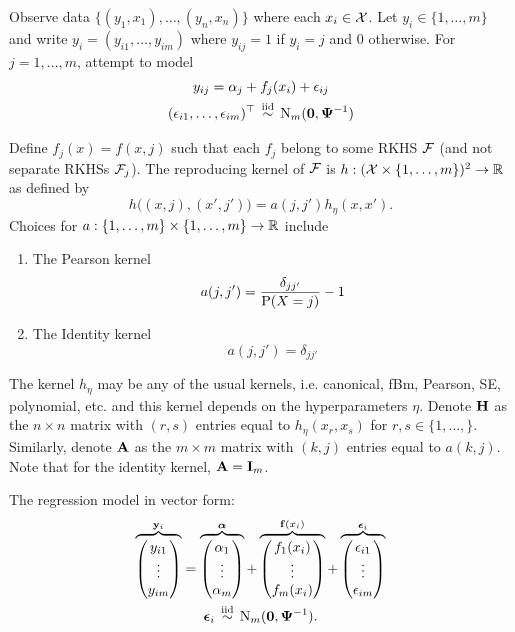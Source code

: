 Observe data $\{(y_1,x_1),\dots,(y_n,x_n) \}$ where each $x_i \in {\mathcal X}$.
Let $y_i \in \{ 1,\dots,m \}$ and write $y_i = (y_{i1},\dots,y_{im})$ where $y_{ij} = 1$ if $y_i = j$ and 0 otherwise.
For $j=1,\dots,m$, attempt to model
\begin{gather*}
  y_{ij} = \alpha_j + f_j(x_i) + \epsilon_{ij}  \\
  (\epsilon_{i1},\dots,\epsilon_{im})^\top \,\overset{\text{iid}}{\sim}\, \operatorname{N}_m({\mathbf 0},{\bm\Psi}^{-1})
\end{gather*}

Define $f_j(x) = f(x,j)$ such that each $f_j$ belong to some RKHS ${\mathcal F}$ (and not separate RKHSs ${\mathcal F}_j$).
The reproducing kernel of ${\mathcal F}$ is $h:({\mathcal X} \times \{1,\dots,m\})^2 \to \mathbb{R}$ as defined by
\[
  h\big( (x,j), (x',j') \big) = a(j,j')h_\eta(x,x').
\]
Choices for $a:\{1,\dots,m\} \times \{1,\dots,m\} \to \mathbb{R}$ include 
\begin{enumerate}
  \item The Pearson kernel
  \[
    a(j,j') = \frac{\delta_{jj'}}{\operatorname{P}(X=j)} - 1
  \]
  \item The Identity kernel
  \[
    a(j,j') = \delta_{jj'}
  \]
\end{enumerate}
The kernel $h_\eta$ may be any of the usual kernels, i.e. canonical, fBm, Pearson, SE, polynomial, etc. and this kernel depends on the hyperparameters $\eta$.
Denote ${\mathbf H}$ as the $n\times n$ matrix with $(r,s)$ entries equal to $h_\eta(x_r,x_s)$ for $r,s\in\{1,\dots,\}$.
Similarly, denote ${\mathbf A}$ as the $m \times m$ matrix with $(k,j)$ entries equal to $a(k,j)$. 
Note that for the identity kernel, ${\mathbf A} = {\mathbf I}_m$.

The regression model in vector form:
\begin{gather*}
  \overbrace{
  \begin{pmatrix}
    y_{i1} \\ \vdots \\ y_{im}
  \end{pmatrix} 
  }^{{\mathbf y}_i}
  = 
  \overbrace{  
  \begin{pmatrix}
    \alpha_{1} \\ \vdots \\ \alpha_{m}
  \end{pmatrix} 
  }^{\bm\alpha}
  +
  \overbrace{    
  \begin{pmatrix}
    f_1(x_i) \\ \vdots \\ f_m(x_i)
  \end{pmatrix} 
  }^{{\mathbf f}(x_i)}
  +
  \overbrace{      
  \begin{pmatrix}
    \epsilon_{i1} \\ \vdots \\ \epsilon_{im}
  \end{pmatrix} 
  }^{{\bm\epsilon}_i}
  \\
  {\bm\epsilon}_i \,\overset{\text{iid}}{\sim}\, \operatorname{N}_m({\mathbf 0},{\bm\Psi}^{-1}).
\end{gather*}

